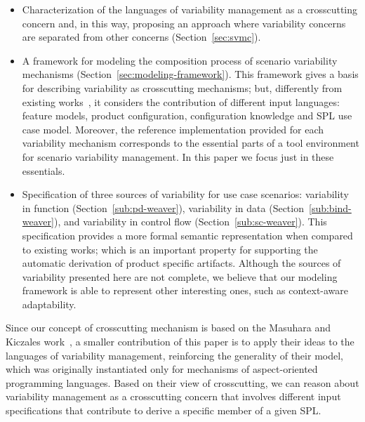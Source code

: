 \documentclass{sig-alternate}
\begin{document}
\begin{itemize}
\item Characterization of the languages of variability management as a
crosscutting concern and, in this way, proposing an approach where variability
concerns are separated from other concerns (Section~\ref{sec:svmc}).


\item A framework for modeling the composition process of scenario variability
mechanisms (Section~\ref{sec:modeling-framework}). This framework gives a basis for
describing variability as crosscutting mechanisms; but, differently from existing
works~\cite{Morin:2008aa,Groher:2008aa}, it considers the contribution of different input
languages: feature models, product configuration, configuration knowledge and SPL use case model. Moreover, the reference implementation provided for each variability
mechanism corresponds to the essential parts of a tool environment for scenario
variability management. In this paper we focus just in these essentials.

\item Specification of three sources of variability for use case
scenarios: variability in function (Section~\ref{sub:pd-weaver}),
variability in data (Section~\ref{sub:bind-weaver}), and variability in control
flow (Section~\ref{sub:sc-weaver}). This specification provides a more formal
semantic representation when compared to existing works; which is an important property
for supporting the automatic derivation of product specific artifacts. Although the sources of
variability presented here are not complete, we believe that our modeling framework is able to represent
other interesting ones, such as context-aware adaptability.
\end{itemize}



Since our concept of crosscutting mechanism is based on the Masuhara and
Kiczales work~\cite{Masuhara:2003aa}, a smaller contribution of this paper is to apply
their ideas to the languages of variability management,  reinforcing the
generality of their model, which was originally instantiated only for mechanisms
of aspect-oriented programming languages. Based on their view of crosscutting, we
can reason about variability management as a crosscutting concern that involves
different input specifications that contribute to derive a specific member of a
given SPL. 
\end{document}
